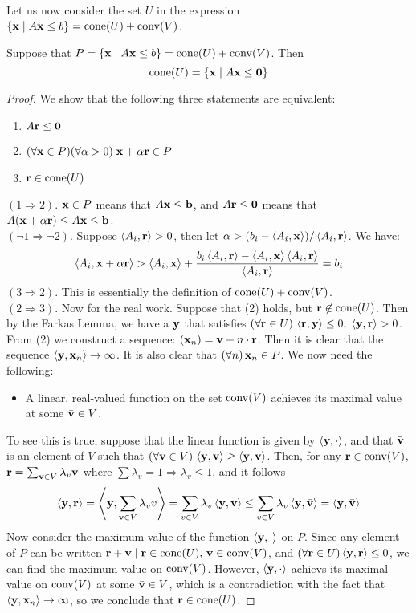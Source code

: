Let us now consider the set $U$ in the expression $\HP{A}{b} = \VP{U}{V}$.

\begin{Prop}\label{characteristic_cone}
	Suppose that $P = \HP{A}{b} = \VP{U}{V}$.  Then
	\[ \cone(U) = \HC{A} \]
\end{Prop}

\begin{proof}
	We show that the following three statements are equivalent:
	\begin{enumerate}
		\item $A\r\leq\0$
		\item $(\forall \x\in P)(\forall \alpha > 0)\;\x + \alpha\r \in P$
		\item $\r \in \cone(U)$
	\end{enumerate}
	$(1 \Rightarrow 2)$. $\x\in P$ means that $A\x\leq\b$, and $A\r\leq\0$ means that $A(\x+\alpha\r) \leq A\x \leq \b$.\\
	$(\neg 1 \Rightarrow \neg 2)$.  Suppose $\ip{A_i}{\r} > 0$, then let $\alpha > (b_i - \ip{A_i}{\x})/\ip{A_i}{\r}$.  We have:
	\[ \ip{A_i}{\x + \alpha\r} > \ip{A_i}{\x} +
		\frac{b_i\ip{A_i}{\r} - \ip{A_i}{\x}\ip{A_i}{\r}}{\ip{A_i}{\r}} = b_i \]
	$(3 \Rightarrow 2)$.  This is essentially the definition of $\VP{U}{V}$.\\
	$(2 \Rightarrow 3)$.  Now for the real work.  Suppose that (2) holds, but $\r\not\in\cone(U)$.  Then by the Farkas Lemma, we have a $\y$ that satisfies $(\forall \r\in U)\,\ip{\r}{\y}\leq 0,\; \ip{\y}{\r} > 0$.  From (2) we construct a sequence: $(\x_n) = \v+n\cdot\r$.  Then it is clear that the sequence $\ip{\y}{\x_n} \to \infty$.  It is also clear that $(\forall n)\,\x_n \in P$.  We now need the following:
	\begin{itemize}
		\item A linear, real-valued function on the set $\conv(V)$ achieves its maximal value at some $\bar\v \in V$.
	\end{itemize}
	To see this is true, suppose that the linear function is given by $\ip{\y}{\cdot}$, and that $\bar\v$ is an element of $V$ such that $(\forall \v \in V)\,\ip{\y}{\bar\v} \geq \ip{\y}{\v}$.  Then, for any $\r \in \conv(V)$, $\r = \sum_{\v\in V} \lambda_v\v$ where $\sum \lambda_v = 1 \Rightarrow \lambda_v \leq 1$, and it follows
	\[\ip{\y}{\r} = \ip{\y}{\sum_{\v\in V}\lambda_v v} = \sum_{v\in V} \lambda_v\ip{\y}{\v}
		\leq \sum_{v\in V}\lambda_v\ip{\y}{\bar\v} = \ip{\y}{\bar\v} \]
	Now consider the maximum value of the function $\ip{\y}{\cdot}$ on $P$.  Since any element of $P$ can be written $\r + \v \st \r\in\cone(U),\,\v\in\conv(V)$, and $(\forall\r\in U) \ip{\y}{\r} \leq 0$, we can find the maximum value on $\conv(V)$.  However, $\ip{\y}{\cdot}$ achievs its maximal value on $\conv(V)$ at some $\bar\v\in V$, which is a contradiction with the fact that $\ip{\y}{\x_n} \to \infty$, so we conclude that $\r\in\cone(U)$.
\end{proof}


